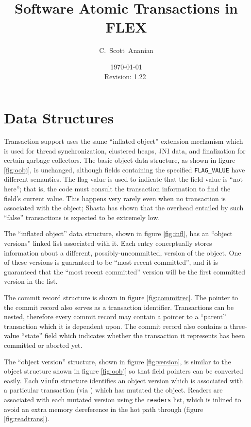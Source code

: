 \documentclass[11pt,notitlepage]{article}
\author{C.~Scott~Ananian}
\title{Software Atomic Transactions in FLEX}
\date{\today \\ $ $Revision: 1.22 $ $}
\begin{document}

\maketitle
\section{Data Structures}

Transaction support uses the same ``inflated object'' extension
mechanism which is used for thread synchronization, clustered heaps,
JNI data, and finalization for certain garbage collectors.
The basic object data structure, as shown in figure \ref{fig:oobj}, is
unchanged, although fields containing the specified
\texttt{FLAG\_VALUE} have different semantics.  The flag value is used
to indicate that the field value is ``not here''; that is, the code
must consult the transaction information to find the field's current
value.  This happens very rarely even when no transaction is
associated with the object; Shasta \cite{scales96:shasta} has shown that the
overhead entailed by such ``false'' transactions is expected to be
extremely low.

The ``inflated object'' data structure, shown in figure
\ref{fig:infl}, has an ``object versions'' linked list associated with
it.  Each entry conceptually stores information about a different,
possibly-uncommitted, version of the object.  One of these versions is
guaranteed to be ``most recent committed'', and it is guaranteed that
the ``most recent committed'' version will be the first committed
version in the list.

The commit record structure is shown in figure \ref{fig:commitrec}.
The pointer to the commit record also serves as a transaction
identifier.  Transactions can be nested, therefore every commit record
may contain a pointer to a ``parent'' transaction which it is
dependent upon.  The commit record also contains a three-value
``state'' field which indicates whether the transaction it represents
has been committed or aborted yet.

The ``object version'' structure, shown in figure
\ref{fig:version}, is similar to the object structure shown in
figure \ref{fig:oobj} so that field pointers can be converted easily.
Each \texttt{vinfo} structure identifies an object version which is
associated with a particular transaction (via ) which
has mutated the object.  Readers are associated with each mutated
version using the \texttt{readers} list, which is inlined to avoid an
extra memory dereference in the hot path through 
(figure \ref{fig:readtrans}).
\end{document}
